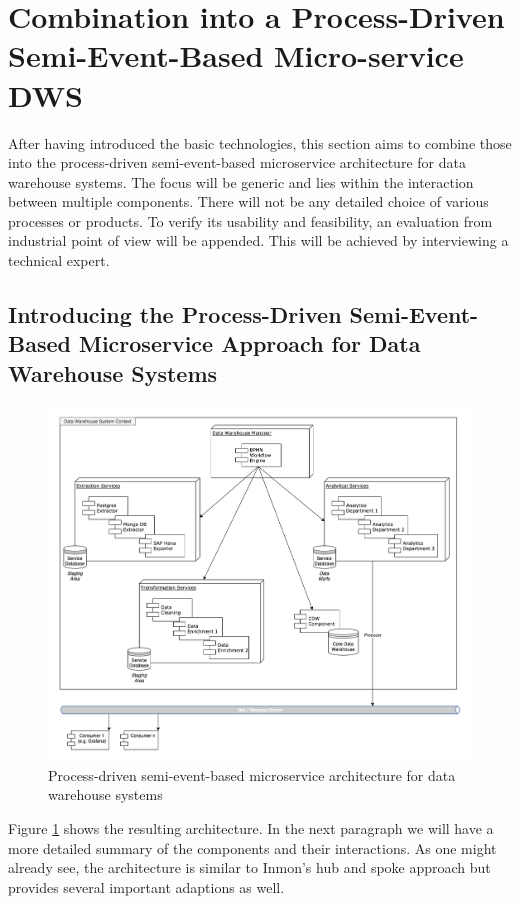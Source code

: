 \section{Combination into a Process-Driven Semi-Event-Based Micro-service DWS}
\label{sec:finalArchitecture}
After having introduced the basic technologies, this section aims to combine those into the process-driven semi-event-based microservice architecture for data warehouse systems. The focus will be generic and lies within the interaction between multiple components. There will not be any detailed choice of various processes or products. To verify its usability and feasibility, an evaluation from industrial point of view will be appended. This will be achieved by interviewing a technical expert.

\subsection{Introducing the Process-Driven Semi-Event-Based Microservice Approach for Data Warehouse Systems}
\begin{figure}[!htb]
    \centering
    \includegraphics[scale=0.43]{pictures/ResultingArchitecture.png}
    \caption{Process-driven semi-event-based microservice architecture for data warehouse systems}
    \label{fig:resultingArch}
\end{figure}
Figure \ref{fig:resultingArch} shows the resulting architecture. In the next paragraph we will have a more detailed summary of the components and their interactions. As one might already see, the architecture is similar to Inmon's hub and spoke approach but provides several important adaptions as well. \newline

